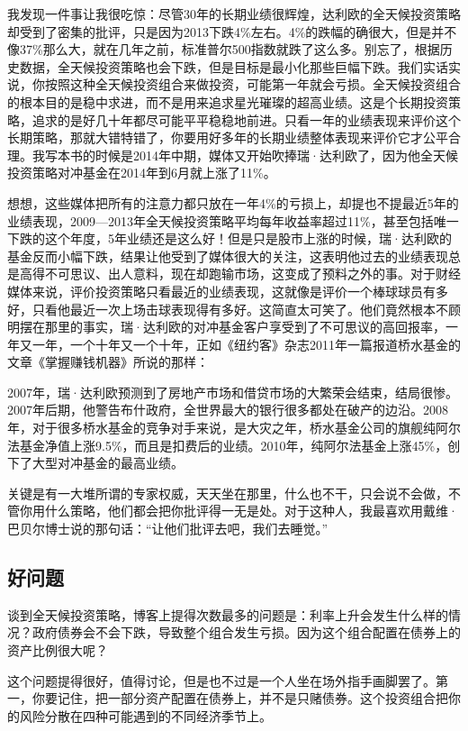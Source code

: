 我发现一件事让我很吃惊：尽管30年的长期业绩很辉煌，达利欧的全天候投资策略却受到了密集的批评，只是因为2013下跌4\%左右。4\%的跌幅的确很大，但是并不像37\%那么大，就在几年之前，标准普尔500指数就跌了这么多。别忘了，根据历史数据，全天候投资策略也会下跌，但是目标是最小化那些巨幅下跌。我们实话实说，你按照这种全天候投资组合来做投资，可能第一年就会亏损。全天候投资组合的根本目的是稳中求进，而不是用来追求星光璀璨的超高业绩。这是个长期投资策略，追求的是好几十年都尽可能平平稳稳地前进。只看一年的业绩表现来评价这个长期策略，那就大错特错了，你要用好多年的长期业绩整体表现来评价它才公平合理。我写本书的时候是2014年中期，媒体又开始吹捧瑞·达利欧了，因为他全天候投资策略对冲基金在2014年到6月就上涨了11\%。

想想，这些媒体把所有的注意力都只放在一年4\%的亏损上，却提也不提最近5年的业绩表现，2009—2013年全天候投资策略平均每年收益率超过11\%，甚至包括唯一下跌的这个年度，5年业绩还是这么好！但是只是股市上涨的时候，瑞·达利欧的基金反而小幅下跌，结果让他受到了媒体很大的关注，这表明他过去的业绩表现总是高得不可思议、出人意料，现在却跑输市场，这变成了预料之外的事。对于财经媒体来说，评价投资策略只看最近的业绩表现，这就像是评价一个棒球球员有多好，只看他最近一次上场击球表现得有多好。这简直太可笑了。他们竟然根本不顾明摆在那里的事实，瑞·达利欧的对冲基金客户享受到了不可思议的高回报率，一年又一年，一个十年又一个十年，正如《纽约客》杂志2011年一篇报道桥水基金的文章《掌握赚钱机器》所说的那样：

2007年，瑞·达利欧预测到了房地产市场和借贷市场的大繁荣会结束，结局很惨。2007年后期，他警告布什政府，全世界最大的银行很多都处在破产的边沿。2008年，对于很多桥水基金的竞争对手来说，是大灾之年，桥水基金公司的旗舰纯阿尔法基金净值上涨9.5\%，而且是扣费后的业绩。2010年，纯阿尔法基金上涨45\%，创下了大型对冲基金的最高业绩。

关键是有一大堆所谓的专家权威，天天坐在那里，什么也不干，只会说不会做，不管你用什么策略，他们都会把你批评得一无是处。对于这种人，我最喜欢用戴维·巴贝尔博士说的那句话：“让他们批评去吧，我们去睡觉。”

\subsection{好问题}

谈到全天候投资策略，博客上提得次数最多的问题是：利率上升会发生什么样的情况？政府债券会不会下跌，导致整个组合发生亏损。因为这个组合配置在债券上的资产比例很大呢？

这个问题提得很好，值得讨论，但是也不过是一个人坐在场外指手画脚罢了。第一，你要记住，把一部分资产配置在债券上，并不是只赌债券。这个投资组合把你的风险分散在四种可能遇到的不同经济季节上。

